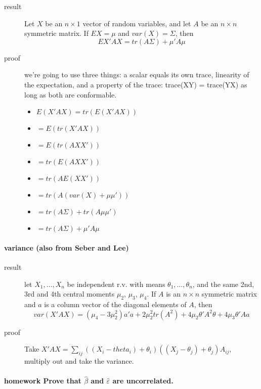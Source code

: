 \begin{description}
\item[result] Let $X$ be an $n\times 1$ vector of random variables,
                  and let $A$ be an $n \times n$ symmetric matrix.  If $E
                  X = \mu$ and $var(X) = \Sigma$, then \[ E X'AX = tr(A
                  \Sigma) + \mu'A\mu \]
\item[proof] we're going to use three things: a scalar equals its own
                 trace, linearity of the expectation, and a property of
                 the trace: trace(XY) = trace(YX) as long as both are
                 conformable.
\begin{itemize}
\item $E(X'AX) = tr(E(X'AX))$
\item $= E(tr(X'AX))$
\item $= E(tr(AXX'))$
\item $= tr(E(AXX'))$
\item $= tr(A E(XX'))$
\item $= tr(A (var(X) + \mu\mu'))$
\item $= tr(A\Sigma) + tr(A \mu\mu')$
\item $= tr(A\Sigma) + \mu'A\mu$
\end{itemize}
\end{description}
\paragraph{variance (also from Seber and Lee)}
\label{sec-3-1-3-2}

\begin{description}
\item[result] let $X_1,\dots,X_n$ be independent r.v. with means
                  $\theta_1,\dots,\theta_n$, and the same 2nd, 3rd and
                  4th central moments $\mu_2$, $\mu_3$, $\mu_4$.  If $A$
                  is an $n\times n$ symmetric matrix and $a$ is a column
                  vector of the diagonal elements of $A$, then
                  \[ var(X'AX) = (\mu_4 - 3 \mu_2^2)a'a + 2 \mu_2^2
                  tr(A^2) + 4 \mu_2 \theta'A^2 \theta + 4 \mu_3 \theta' A
                  a \]
\item[proof] Take $X'A X = \sum_{ij} ((X_i - theta_i) + \theta_i) ((X_j - \theta_j) + \theta_j) A_{ij}$, multiply out and take the variance.
\end{description}
\paragraph{\textbf{homework} Prove that $\hat\beta$ and $\hat\varepsilon$ are uncorrelated.}
\label{sec-3-1-4}
